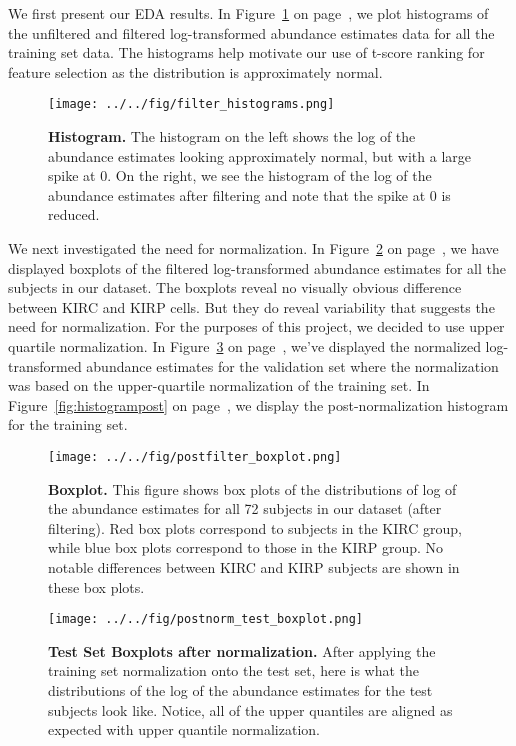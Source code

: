 We first present our EDA results.  In Figure~\ref{fig:histogram} on
page~\pageref{fig:histogram}, we plot histograms of the unfiltered
and filtered log-transformed abundance estimates data for all the
training set data.  The histograms help motivate our use of t-score
ranking for feature selection as the distribution is approximately
normal.

\begin{figure}[H]
  \centering
    \texttt{[image: ../../fig/filter\_histograms.png]}
\caption{\textbf{Histogram.} The histogram on the left shows the log of the abundance estimates looking
  approximately normal, but with a large spike at 0.  On the right, we see the
  histogram of the log of the abundance estimates after filtering and note that the spike at 0 is
  reduced.}
   \label{fig:histogram}
\end{figure}

We next investigated the need for normalization.  In Figure~\ref{fig:boxplot}
on page~\pageref{fig:boxplot}, we have displayed boxplots of the filtered
log-transformed abundance estimates for all the subjects in our dataset.  The
boxplots reveal no visually obvious difference between KIRC and KIRP cells.
But they do reveal variability that suggests the need for normalization.
For the purposes of this project, we decided to use upper quartile normalization.
In Figure~\ref{fig:boxplotpost} on page~\pageref{fig:boxplotpost}, we've displayed
the normalized log-transformed abundance estimates for the validation set where
the normalization was based on the upper-quartile normalization of the training
set.  In Figure~\ref{fig:histogrampost} on page~\pageref{fig:histogrampost},
we display the post-normalization histogram for the training set.

\begin{figure}[H]
  \centering
    \texttt{[image: ../../fig/postfilter\_boxplot.png]}
\caption{\textbf{Boxplot.} This figure shows box plots of the distributions of
  log of the abundance estimates for all 72 subjects in our dataset (after filtering). Red 	box
  plots correspond to subjects in the KIRC group, while blue box plots correspond
  to those in the KIRP group. No notable differences between KIRC and KIRP
  subjects are shown in these box plots.}
   \label{fig:boxplot}
\end{figure}


\begin{figure}[H]
  \centering
    \texttt{[image: ../../fig/postnorm\_test\_boxplot.png]}
\caption{\textbf{Test Set Boxplots after normalization.} After applying the training
  set normalization onto the test set, here is what the distributions of the
  log of the abundance estimates for the test subjects look like. Notice, all of the upper quantiles
  are aligned as expected with upper quantile normalization.}
   \label{fig:boxplotpost}
\end{figure}


